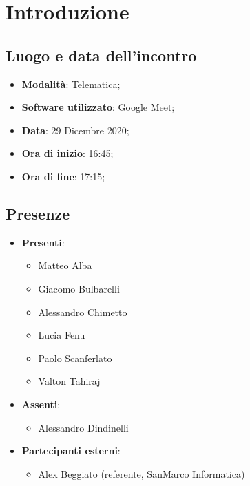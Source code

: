 \documentclass[]{article}
\begin{document}
	
	
	
	\newpage
	
	
	\section{Introduzione}
		\subsection{Luogo e data dell'incontro}
		\begin{itemize}
			\item \textbf{Modalità}: Telematica;
			\item \textbf{Software utilizzato}: Google Meet;
			\item \textbf{Data}: 29 Dicembre 2020;
			\item \textbf{Ora di inizio}: 16:45;
			\item \textbf{Ora di fine}: 17:15;
		\end{itemize}
		
		\subsection{Presenze}
		\begin{itemize}
			\item \textbf{Presenti}: 
			\begin{itemize}
				\item Matteo Alba
				\item Giacomo Bulbarelli
				\item Alessandro Chimetto
				\item Lucia Fenu
				\item Paolo Scanferlato
				\item Valton Tahiraj
			\end{itemize}
			\item \textbf{Assenti}:
			\begin{itemize}
				\item Alessandro Dindinelli
			\end{itemize}
			\item \textbf{Partecipanti esterni}:
			\begin{itemize}
				\item Alex Beggiato (referente, SanMarco Informatica)
			\end{itemize}	
		\end{itemize}
		
\end{document}
